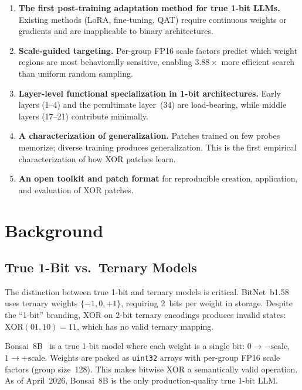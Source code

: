 \documentclass[11pt,a4paper]{article}
\begin{document}
\begin{enumerate}[nosep]
  \item \textbf{The first post-training adaptation method for true 1-bit
    LLMs.} Existing methods (LoRA, fine-tuning, QAT) require continuous
    weights or gradients and are inapplicable to binary architectures.
  \item \textbf{Scale-guided targeting.} Per-group FP16 scale factors
    predict which weight regions are most behaviorally sensitive, enabling
    $3.88\times$ more efficient search than uniform random sampling.
  \item \textbf{Layer-level functional specialization in 1-bit
    architectures.} Early layers (1--4) and the penultimate layer~(34)
    are load-bearing, while middle layers (17--21) contribute minimally.
  \item \textbf{A characterization of generalization.} Patches trained on
    few probes memorize; diverse training produces generalization. This
    is the first empirical characterization of how XOR patches learn.
  \item \textbf{An open toolkit and patch format} for reproducible
    creation, application, and evaluation of XOR patches.
\end{enumerate}

\section{Background}

\subsection{True 1-Bit vs.\ Ternary Models}

The distinction between true 1-bit and ternary models is critical.
BitNet~b1.58~\citep{wang2023bitnet,ma2025bitnet} uses ternary weights
$\{-1, 0, +1\}$, requiring 2~bits per weight in storage. Despite the
``1-bit'' branding, XOR on 2-bit ternary encodings produces invalid
states: $\text{XOR}(01, 10) = 11$, which has no valid ternary mapping.

Bonsai~8B~\citep{prismml2026} is a true 1-bit model where each weight
is a single bit: $0 \to -\text{scale}$, $1 \to +\text{scale}$. Weights
are packed as \texttt{uint32} arrays with per-group FP16 scale factors
(group size~128). This makes bitwise XOR a semantically valid operation.
As of April~2026, Bonsai~8B is the only production-quality true 1-bit LLM.
\end{document}
